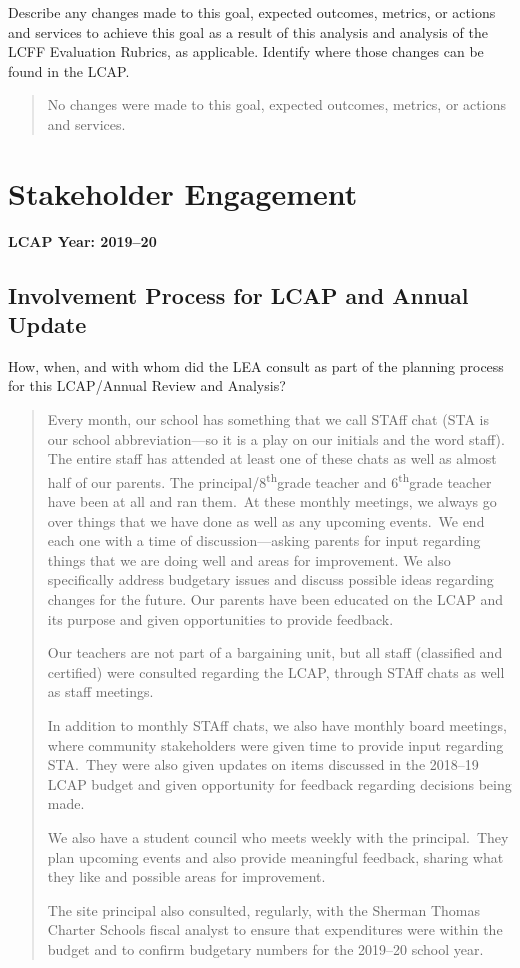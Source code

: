 \documentclass{article}
\renewcommand{\th}{\textsuperscript{th}}
\newcounter{goal}[section] %
\newcounter{action}[goal]
\begin{document}
Describe any changes made to this goal, expected outcomes, metrics, or actions and services to achieve this goal as a result of this analysis and analysis of the LCFF Evaluation Rubrics, as applicable. Identify where those changes can be found in the LCAP.
\begin{quotation}
	No changes were made to this goal, expected outcomes, metrics, or actions and services.
\end{quotation}

\section{Stakeholder Engagement}
{\bf LCAP Year: 2019--20}

\subsection{Involvement Process for LCAP and Annual Update}
How, when, and with whom did the LEA consult as part of the planning process for this LCAP/Annual Review and Analysis?
\begin{quotation}
	Every month, our school has something that we call STAff chat (STA is our school abbreviation---so it is a play on our initials and the word staff).  The entire staff has attended at least one of these chats as well as almost half of our parents. The principal/8\th grade teacher and 6\th grade teacher have been at all and ran them. At these monthly meetings, we always go over things that we have done as well as any upcoming events. We end each one with a time of discussion---asking parents for input regarding things that we are doing well and areas for improvement. We also specifically address budgetary issues and discuss possible ideas regarding changes for the future. Our parents have been educated on the LCAP and its purpose and given opportunities to provide feedback.

	Our teachers are not part of a bargaining unit, but all staff (classified and certified) were consulted regarding the LCAP, through STAff chats as well as staff meetings.

	In addition to monthly STAff chats, we also have monthly board meetings, where community stakeholders were given time to provide input regarding STA. They were also given updates on items discussed in the 2018--19 LCAP budget and given opportunity for feedback regarding decisions being made.

	We also have a student council who meets weekly with the principal. They plan upcoming events and also provide meaningful feedback, sharing what they like and possible areas for improvement.

	The site principal also consulted, regularly, with the Sherman Thomas Charter Schools fiscal analyst to ensure that expenditures were within the budget and to confirm budgetary numbers for the 2019--20 school year.
\end{quotation}
\end{document}
